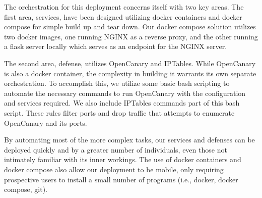 The orchestration for this deployment concerns itself with two key areas. The first area, services, 
have been designed utilizing docker containers and docker compose for simple build up and tear down. 
Our docker compose solution utilizes two docker images, one running NGINX as a reverse proxy, 
and the other running a flask server locally which serves as an endpoint for the NGINX server. 

The second area, defense, utilizes OpenCanary and IPTables. While OpenCanary is also a docker container, the 
complexity in building it warrants its own separate orchestration. To accomplish this, we utilize 
some basic bash scripting to automate the necessary commands to run OpenCanary with the configuration and 
services required. We also include IPTables commands part of this bash script. These rules filter ports and 
drop traffic that attempts to enumerate OpenCanary and its ports. 

By automating most of the more complex tasks, our services and defenses can be deployed quickly 
and by a greater number of individuals, even those not intimately familiar with its inner workings. 
The use of docker containers and docker compose also allow our deployment to be mobile, only requiring 
prospective users to install a small number of programs (i.e., docker, docker compose, git). 


